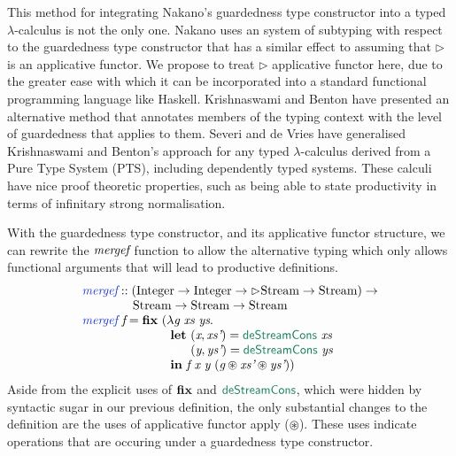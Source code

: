 This method for integrating Nakano's guardedness type constructor into
a typed $\lambda$-calculus is not the only one.  Nakano uses an system
of subtyping with respect to the guardedness type constructor that has
a similar effect to assuming that $\rhd$ is an applicative functor. We
propose to treat $\rhd$ applicative functor here, due to the greater
ease with which it can be incorporated into a standard functional
programming language like Haskell. Krishnaswami and Benton
\cite{krishnaswami11semantic,krishnaswami11ultrametric} have presented
an alternative method that annotates members of the typing context
with the level of guardedness that applies to them. Severi and de
Vries \cite{severi12pure} have generalised Krishnaswami and Benton's
approach for any typed $\lambda$-calculus derived from a Pure Type
System (PTS), including dependently typed systems. These calculi have
nice proof theoretic properties, such as being able to state
productivity in terms of infinitary strong normalisation.

With the guardedness type constructor, and its applicative functor
structure, we can rewrite the $\textit{mergef}$ function to allow the
alternative typing which only allows functional arguments that will
lead to productive definitions.
\begin{displaymath}
  \begin{array}{l}
    \defn{mergef} :: (\tyname{Integer} \to \tyname{Integer} \to \rhd\tyname{Stream} \to \tyname{Stream}) \to \\
    \textcolor{white}{\textrm{mergef} :: }\ \tyname{Stream} \to \tyname{Stream} \to \tyname{Stream} \\
    \defn{mergef}\ \ident{f} = \kw{fix}\ (\lambda \ident{g}\ \ident{xs}\ \ident{ys}. \\
    \hspace{2.5cm} \kw{let}\ (\ident{x}, \ident{xs'}) = \elim{deStreamCons}\ \ident{xs} \\
    \hspace{2.5cm} \textcolor{white}{\kw{let}\ }(\ident{y}, \ident{ys'}) = \elim{deStreamCons}\ \ident{ys} \\
    \hspace{2.5cm} \kw{in}\ \ident{f}\ \ident{x}\ \ident{y}\ (\ident{g} \circledast \ident{xs'} \circledast \ident{ys'}))
  \end{array}
\end{displaymath}
Aside from the explicit uses of $\textbf{fix}$ and $\elim{deStreamCons}$,
which were hidden by syntactic sugar in our previous definition, the
only substantial changes to the definition are the uses of applicative
functor apply ($\circledast$). These uses indicate operations that are
occuring under a guardedness type constructor.


